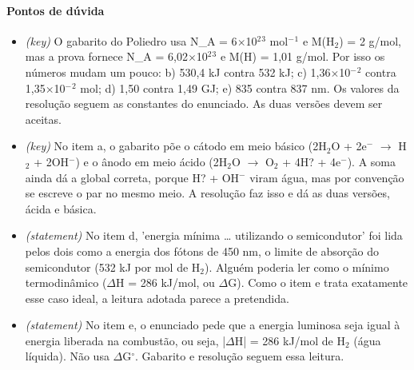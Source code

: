 \documentclass{article}%
\begin{document}
\paragraph{Pontos de dúvida}%
\begin{itemize}%
\item%
\textit{(key)} O gabarito do Poliedro usa N\_A = 6$\times$10$^2$$^3$ mol$^{-}$$^{1}$ e M(H$_{2}$) = 2 g/mol, mas a prova fornece N\_A = 6,02$\times$10$^2$$^3$ e M(H) = 1,01 g/mol. Por isso os números mudam um pouco: b) 530,4 kJ contra 532 kJ; c) 1,36$\times$10$^{-}$$^2$ contra 1,35$\times$10$^{-}$$^2$ mol; d) 1,50 contra 1,49 GJ; e) 835 contra 837 nm. Os valores da resolução seguem as constantes do enunciado. As duas versões devem ser aceitas.%
\item%
\textit{(key)} No item a, o gabarito põe o cátodo em meio básico (2H$_{2}$O + 2e$^{-}$ $\to$ H$_{2}$ + 2OH$^{-}$) e o ânodo em meio ácido (2H$_{2}$O $\to$ O$_{2}$ + 4H? + 4e$^{-}$). A soma ainda dá a global correta, porque H? + OH$^{-}$ viram água, mas por convenção se escreve o par no mesmo meio. A resolução faz isso e dá as duas versões, ácida e básica.%
\item%
\textit{(statement)} No item d, 'energia mínima \ldots{} utilizando o semicondutor' foi lida pelos dois como a energia dos fótons de 450 nm, o limite de absorção do semicondutor (532 kJ por mol de H$_{2}$). Alguém poderia ler como o mínimo termodinâmico ($\Delta$H = 286 kJ/mol, ou $\Delta$G). Como o item e trata exatamente esse caso ideal, a leitura adotada parece a pretendida.%
\item%
\textit{(statement)} No item e, o enunciado pede que a energia luminosa seja igual à energia liberada na combustão, ou seja, |$\Delta$H| = 286 kJ/mol de H$_{2}$ (água líquida). Não usa $\Delta$G$^\circ$. Gabarito e resolução seguem essa leitura.%
\end{itemize}%
\end{document}
